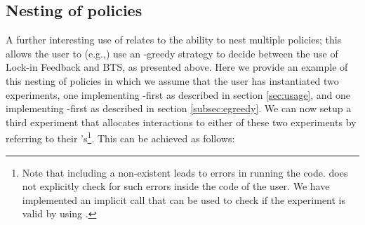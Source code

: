 \documentclass[nojss]{jss}
\begin{document}
\subsection{Nesting of policies}
\label{sec:nesting}

A further interesting use of  relates to the ability to nest multiple policies; this allows the user to (e.g.,) use an -greedy strategy to decide between the use of Lock-in Feedback and BTS, as presented above. Here we provide an example of this nesting of policies in which we assume that the user has instantiated two experiments, one implementing -first as described in section \ref{sec:usage}, and one implementing -first as described in section \ref{subsec:egreedy}. We can now setup a third experiment that allocates interactions to either of these two experiments by referring to their 's\footnote{Note that including a non-existent  leads to errors in running the code.  does not explicitly check for such errors inside the code of the user. We have implemented an implicit call that can be used to check if the experiment is valid by using .}. This can be achieved as follows:
\end{document}
